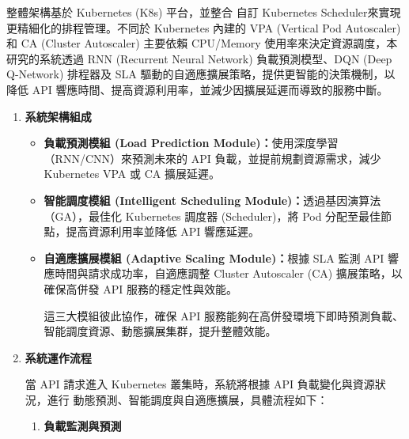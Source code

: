 \documentclass[12pt,a4paper]{article}
\begin{document}
\begin{enumerate}[label={(\zhdig*)}, leftmargin=2\parindent, listparindent=\parindent]
\begin{enumerate}[label={(\arabic*)}, leftmargin=\parindent, listparindent=\parindent]
整體架構基於 Kubernetes (K8s) 平台，並整合 自訂 Kubernetes Scheduler\cite{19}來實現更精細化的排程管理。不同於 Kubernetes 內建的 VPA (Vertical Pod Autoscaler) 和 CA (Cluster Autoscaler) 主要依賴 CPU/Memory 使用率來決定資源調度\cite{18}，本研究的系統透過 RNN (Recurrent Neural Network) 負載預測模型、DQN (Deep Q-Network) 排程器及 SLA 驅動的自適應擴展策略，提供更智能的決策機制，以 降低 API 響應時間、提高資源利用率，並減少因擴展延遲而導致的服務中斷。
\begin{enumerate}[label={(\zhdig*)}, leftmargin=\parindent, listparindent=\parindent]
\item \textbf{
系統架構組成}

\begin{itemize}[leftmargin=\parindent, listparindent=\parindent]
\\本系統架構主要包含三大核心模組，各自負責不同層級的優化：

\item \textbf{負載預測模組 (Load Prediction Module)：}使用深度學習（RNN/CNN）來預測未來的 API 負載，並提前規劃資源需求，減少 Kubernetes VPA 或 CA 擴展延遲。
\item \textbf{智能調度模組 (Intelligent Scheduling Module)：}透過基因演算法（GA），最佳化 Kubernetes 調度器 (Scheduler)，將 Pod 分配至最佳節點，提高資源利用率並降低 API 響應延遲。
\item \textbf{自適應擴展模組 (Adaptive Scaling Module)：}根據 SLA 監測 API 響應時間與請求成功率，自適應調整 Cluster Autoscaler (CA) 擴展策略，以確保高併發 API 服務的穩定性與效能。

這三大模組彼此協作，確保 API 服務能夠在高併發環境下即時預測負載、智能調度資源、動態擴展集群，提升整體效能。

\end{itemize}
    \item \textbf{
系統運作流程}

當 API 請求進入 Kubernetes 叢集時，系統將根據 API 負載變化與資源狀況，進行 動態預測、智能調度與自適應擴展，具體流程如下：
\begin{enumerate}[label={(\arabic*)}, leftmargin=\parindent, listparindent=\parindent]

    \item\textbf{
負載監測與預測}
\begin{itemize}[leftmargin=\parindent, listparindent=\parindent]


\end{itemize}
\end{enumerate}
\end{enumerate}
\end{enumerate}
\end{enumerate}
\end{document}
